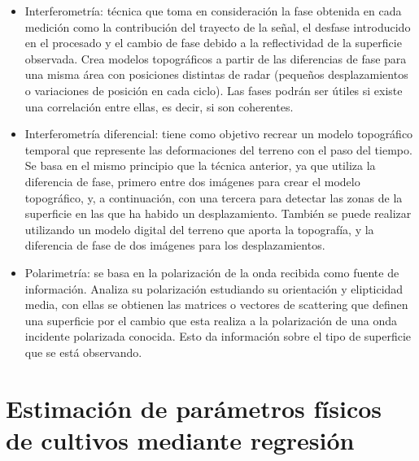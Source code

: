 \begin{itemize}
	\item Interferometría: técnica que toma en consideración la fase obtenida en cada medición como la contribución del trayecto de la señal, el desfase introducido en el procesado y el cambio de fase debido a la reflectividad de la superficie observada. Crea modelos topográficos a partir de las diferencias de fase para una misma área con posiciones distintas de radar (pequeños desplazamientos o variaciones de posición en cada ciclo). Las fases podrán ser útiles si existe una correlación entre ellas, es decir, si son coherentes.
	\item Interferometría diferencial: tiene como objetivo recrear un modelo topográfico temporal que represente las deformaciones del terreno con el paso del tiempo. Se basa en el mismo principio que la técnica anterior, ya que utiliza la diferencia de fase, primero entre dos imágenes para crear el modelo topográfico, y, a continuación, con una tercera para detectar las zonas de la superficie en las que ha habido un desplazamiento. También se puede realizar utilizando un modelo digital del terreno que aporta la topografía, y la diferencia de fase de dos imágenes para los desplazamientos. 
	\item Polarimetría: se basa en la polarización de la onda recibida como fuente de información. Analiza su polarización estudiando su orientación y elipticidad media, con ellas se obtienen las matrices o vectores de scattering que definen una superficie por el cambio que esta realiza a la polarización de una onda incidente polarizada conocida. Esto da información sobre el tipo de superficie que se está observando. 
\end{itemize}
\section{Estimación de parámetros físicos de cultivos mediante regresión}
 